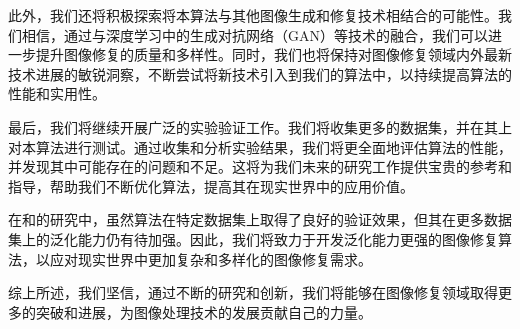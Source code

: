 此外，我们还将积极探索将本算法与其他图像生成和修复技术相结合的可能性。我们相信，通过与深度学习中的生成对抗网络（GAN）等技术的融合，我们可以进一步提升图像修复的质量和多样性。同时，我们也将保持对图像修复领域内外最新技术进展的敏锐洞察，不断尝试将新技术引入到我们的算法中，以持续提高算法的性能和实用性。

最后，我们将继续开展广泛的实验验证工作。我们将收集更多的数据集，并在其上对本算法进行测试。通过收集和分析实验结果，我们将更全面地评估算法的性能，并发现其中可能存在的问题和不足。这将为我们未来的研究工作提供宝贵的参考和指导，帮助我们不断优化算法，提高其在现实世界中的应用价值。

在\cite{Inverse}和\cite{song2023pseudoinverse}的研究中，虽然算法在特定数据集上取得了良好的验证效果，但其在更多数据集上的泛化能力仍有待加强。因此，我们将致力于开发泛化能力更强的图像修复算法，以应对现实世界中更加复杂和多样化的图像修复需求。

综上所述，我们坚信，通过不断的研究和创新，我们将能够在图像修复领域取得更多的突破和进展，为图像处理技术的发展贡献自己的力量。